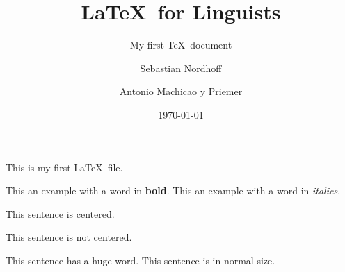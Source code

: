 \documentclass[10pt, paper=a4, abstracton]{scrartcl}
\author{Sebastian Nordhoff \and Antonio Machicao y Priemer}
\title{\LaTeX\ for Linguists}
\subtitle{My first \TeX\ document}
\date{\today}
\begin{document}
\maketitle

This is my first \LaTeX\ file. 

This an example with a word in \textbf{bold}. This an example with a word in \textit{italics}.

\begin{center}
	This sentence is centered.
\end{center}

This sentence is not centered. 

This sentence has a {\Huge huge} word. This sentence is in normal size.
\end{document}
